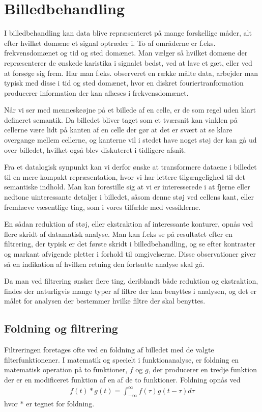 \section{Billedbehandling}
I billedbehandling kan data blive repræsenteret på mange forskellige måder, alt efter hvilket domæne et signal optræder i. To af områderne er f.eks. frekvensdomænet og tid og sted domænet. Man vælger så hvilket domæne der repræsenterer de ønskede karistika i signalet bedst, ved at lave et gæt, eller ved at forsøge sig frem. Har man f.eks. observeret en række målte data, arbejder man typisk med disse i tid og sted domænet, hvor en diskret fouriertranformation producerer information der kan aflæses i frekvensdomænet. 

Når vi ser med menneskeøjne på et billede af en celle, er de som regel uden klart defineret semantik. Da billedet bliver taget som et tværsnit kan vinklen på cellerne være lidt på kanten af en celle der gør at det er svært at se klare overgange mellem cellerne, og kanterne vil i stedet have noget støj der kan gå ud over billedet, hvilket også blev diskuteret i tidligere afsnit.

Fra et datalogisk synpunkt kan vi derfor ønske at transformere dataene i billedet til en mere kompakt repræsentation, hvor vi har lettere tilgængelighed til det semantiske indhold. Man kan forestille sig at vi er interesserede i at fjerne eller nedtone uinteressante detaljer i billedet, såsom denne støj ved cellens kant, eller fremhæve væsentlige ting, som i vores tilfælde med vessiklerne. 

En sådan reduktion af støj, eller ekstraktion af interessante konturer, opnås ved flere skridt af datamatisk analyse. Man kan f.eks se på resultatet efter en filtrering, der typisk er det første skridt i billedbehandling, og se efter kontraster og markant afvigende pletter i forhold til omgivelserne. Disse observationer giver så en indikation af hvilken retning den fortsatte analyse skal gå.

Da man ved filtrering ønsker flere ting, deriblandt både reduktion og ekstraktion, findes der naturligvis mange typer af filtre der kan benyttes i analysen, og det er målet for analysen der bestemmer hvilke filtre der skal benyttes. 

\subsection{Foldning og filtrering}
Filtreringen foretages ofte ved en foldning af billedet med de valgte filterfunktionener. I matematik og specielt i funktionanalyse, er foldning en matematisk operation på to funktioner, $f$ og $g$, der producerer en tredje funktion der er en modificeret funktion af en af de to funktioner. Foldning opnås ved
\begin{align}
	f(t)*g(t)=\int_{-\infty}^{\infty}f(\tau)g(t-\tau)d\tau
\end{align}
hvor $*$ er tegnet for foldning. 


